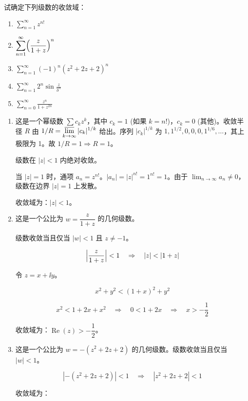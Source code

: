 \begin{question}
试确定下列级数的收敛域：
\begin{enumerate}
  \item \(\displaystyle\sum_{n=1}^{\infty} z^{n!}\)
  \item \(\displaystyle\sum_{n=1}^{\infty} \Bigl(\frac{z}{1+z}\Bigr)^n\)
  \item \(\displaystyle\sum_{n=1}^{\infty} (-1)^n (z^2 + 2z + 2)^n\)
  \item \(\displaystyle\sum_{n=1}^{\infty} 2^n \sin\frac{z}{3^n}\)
  \item \(\displaystyle\sum_{n=0}^{\infty} \frac{z^n}{1+z^{2n}}\)
\end{enumerate}

\begin{solution}
\begin{enumerate}
  \item
    这是一个幂级数 \(\sum c_k z^k\)，其中 \(c_k = 1\) (如果 \(k=n!\))，\(c_k=0\) (其他)。收敛半径 \(R\) 由 \(1/R = \displaystyle\varlimsup_{k\to\infty} |c_k|^{1/k}\) 给出。序列 \(|c_k|^{1/k}\) 为 \(1, 1^{1/2}, 0, 0, 0, 1^{1/6}, \dots\)，其上极限为 1。故 \(1/R = 1 \Rightarrow R=1\)。

    级数在 \(|z| < 1\) 内绝对收敛。

    当 \(|z| = 1\) 时，通项 \(a_n = z^{n!}\)。\(|a_n| = |z|^{n!} = 1^{n!} = 1\)。由于 \(\displaystyle\lim_{n\to\infty} a_n \neq 0\)，级数在边界 \(|z|=1\) 上发散。

    收敛域为：\(|z| < 1\)。
  \item
    这是一个公比为 \(w = \dfrac{z}{1+z}\) 的几何级数。

    级数收敛当且仅当 \(|w| < 1\) 且 \(z \neq -1\)。

    \[
    \Bigl|\frac{z}{1+z}\Bigr| < 1 \quad\Rightarrow\quad |z| < |1+z|
    \]

    令 \(z = x + \ii y\)。

    \[
    x^2 + y^2 < (1+x)^2 + y^2
    \]

    \[
    x^2 < 1 + 2x + x^2 \quad\Rightarrow\quad 0 < 1 + 2x \quad\Rightarrow\quad x > -\frac12
    \]

    收敛域为：\(\operatorname{Re}(z) > -\dfrac12\)。
  \item
    这是一个公比为 \(w = -(z^2 + 2z + 2)\) 的几何级数。级数收敛当且仅当 \(|w| < 1\)。

    \[
    |-(z^2 + 2z + 2)| < 1 \quad\Rightarrow\quad |z^2 + 2z + 2| < 1
    \]

    收敛域为：


\end{enumerate}
\end{solution}
\end{question}
